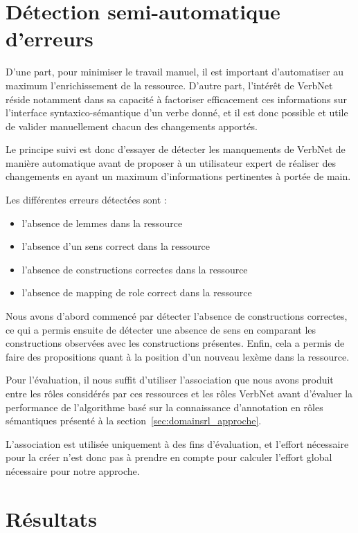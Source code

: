 \section{Détection semi-automatique d'erreurs}

D'une part, pour minimiser le travail manuel, il est important d'automatiser au
maximum l'enrichissement de la ressource. D'autre part, l'intérêt de VerbNet
réside notamment dans sa capacité à factoriser efficacement ces informations
sur l'interface syntaxico-sémantique d'un verbe donné, et il est donc possible
et utile de valider manuellement chacun des changements apportés.

Le principe suivi est donc d'essayer de détecter les manquements de VerbNet de
manière automatique avant de proposer à un utilisateur expert de réaliser des
changements en ayant un maximum d'informations pertinentes à portée de main.

Les différentes erreurs détectées sont :
\begin{itemize}
    \item l'absence de lemmes dans la ressource
    \item l'absence d'un sens correct dans la ressource
    \item l'absence de constructions correctes dans la ressource
    \item l'absence de mapping de role correct dans la ressource
\end{itemize}

Nous avons d'abord commencé par détecter l'absence de constructions correctes,
ce qui a permis ensuite de détecter une absence de sens en comparant les
constructions observées avec les constructions présentes. Enfin, cela a permis
de faire des propositions quant à la position d'un nouveau lexème dans la
ressource.


\fi

Pour l'évaluation, il nous suffit d'utiliser l'association que nous avons
produit entre les rôles considérés par ces ressources et les rôles VerbNet
avant d'évaluer la performance de l'algorithme basé sur la connaissance
d'annotation en rôles sémantiques présenté à la
section~\ref{sec:domainsrl_approche}.

L'association est utilisée uniquement à des fins d'évaluation, et l'effort
nécessaire pour la créer n'est donc pas à prendre en compte pour calculer
l'effort global nécessaire pour notre approche.

\section{Résultats}
\label{sec:domainsrlresults}

